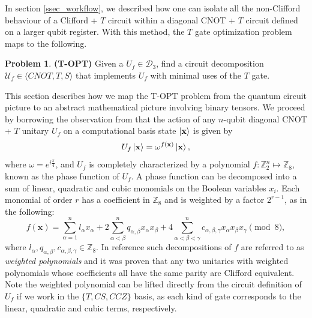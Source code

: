 \documentclass[notitlepage]{article}
\theoremstyle{definition}
\newtheorem{definition}{Definition}[section]
\theoremstyle{problem}
\newtheorem{problem}{Problem}[section]
\theoremstyle{lemma}
\begin{document}
In section \ref{ssec_workflow}, we described how one can isolate all the non-Clifford behaviour of a Clifford + $T$ circuit within a diagonal CNOT + $T$ circuit defined on a larger qubit register. With this method, the $T$ gate optimization problem maps to the following.
\begin{problem}{\textbf{(T-OPT)}}
	Given a $U_f \in \mathcal{D}_3$, find a circuit decomposition $\mathcal{U}_f \in \langle CNOT, T, S \rangle$ that implements $U_f$ with minimal uses of the $T$ gate.
\end{problem}
This section describes how we map the T-OPT problem from the quantum circuit picture to an abstract mathematical picture involving binary tensors. We proceed by borrowing the observation from \cite{5_Amy_2013,6_Amy_2013} that the action of any $n$-qubit diagonal CNOT + $T$ unitary $U_f$ on a computational basis state $\left\vert{\mathbf{x}}\right\rangle$ is given by
\begin{equation}
\label{eq_U_f}
U_f \left\vert{\mathbf{x}}\right\rangle = \omega^{f(\mathbf{x})}\left\vert{\mathbf{x}}\right\rangle,
\end{equation}
where $\omega = e^{i \frac{\pi}{4}}$, and $U_f$ is completely characterized by a polynomial $f: \mathbb{Z}_2^n \mapsto \mathbb{Z}_8$, known as the phase function of $U_f$. A phase function can be decomposed into a sum of linear, quadratic and cubic monomials on the Boolean variables $x_i$. Each monomial of order $r$ has a coefficient in $\mathbb{Z}_8$ and is weighted by a factor $2^{r-1}$, as in the following:
\begin{equation}
\label{eq_wp}
f(\mathbf{x}) = \sum_{\alpha=1}^{n}l_{\alpha}x_\alpha + 2\sum_{\alpha<\beta}^{n} q_{\alpha,\beta}x_\alpha x_\beta + 4\sum_{\alpha<\beta<\gamma}^{n}c_{\alpha,\beta,\gamma}x_\alpha x_\beta x_\gamma \pmod{8},
\end{equation}
where $l_{\alpha},q_{\alpha,\beta},c_{\alpha,\beta,\gamma} \in \mathbb{Z}_8$.
In reference \cite{4_Campbell_2017} such decompositions of $f$ are referred to as \emph{weighted polynomials} and it was proven that any two unitaries with weighted polynomials whose coefficients all have the same parity are Clifford equivalent. Note the weighted polynomial can be lifted directly from the circuit definition of $U_f$ if we work in the $\{T, CS, CCZ\}$ basis, as each kind of gate corresponds to the linear, quadratic and cubic terms, respectively.
\end{document}
